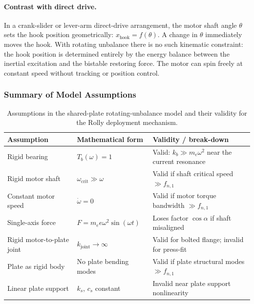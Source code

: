 \documentclass[11pt,letterpaper]{article}
\begin{document}
\paragraph{Contrast with direct drive.}
In a crank-slider or lever-arm direct-drive arrangement, the motor shaft angle
$\theta$ sets the hook position geometrically:
$x_{\mathrm{hook}} = f(\theta)$.  A change in $\theta$ immediately moves the
hook.  With rotating unbalance there is no such kinematic constraint: the hook
position is determined entirely by the energy balance between the inertial
excitation and the bistable restoring force.  The motor can spin freely at
constant speed without tracking or position control.

\subsubsection{Summary of Model Assumptions}
\label{sssec:assumptions}

\begin{table}[H]
\centering
\caption{Assumptions in the shared-plate rotating-unbalance model and their
         validity for the Rolly deployment mechanism.}
\renewcommand{\arraystretch}{1.35}
\begin{tabular}{p{4.2cm} p{4.5cm} p{5.0cm}}
\toprule
\textbf{Assumption} & \textbf{Mathematical form} & \textbf{Validity / break-down} \\
\midrule
Rigid bearing
  & $T_b(\omega) = 1$
  & Valid: $k_b \gg m_e\omega^2$ near the current resonance \\
Rigid motor shaft
  & $\omega_{\mathrm{crit}} \gg \omega$
  & Valid if shaft critical speed $\gg f_{n,1}$ \\
Constant motor speed
  & $\dot\omega = 0$
  & Valid if motor torque bandwidth $\gg f_{n,1}$ \\
Single-axis force
  & $F = m_e e \omega^2 \sin(\omega t)$
  & Loses factor $\cos\alpha$ if shaft misaligned \\
Rigid motor-to-plate joint
  & $k_{\mathrm{joint}} \to \infty$
  & Valid for bolted flange; invalid for press-fit \\
Plate as rigid body
  & No plate bending modes
  & Valid if plate structural modes $\gg f_{n,1}$ \\
Linear plate support
  & $k_s$, $c_s$ constant
  & Invalid near plate support nonlinearity \\
\bottomrule
\end{tabular}
\label{tab:assumptions}
\end{table}
\end{document}
